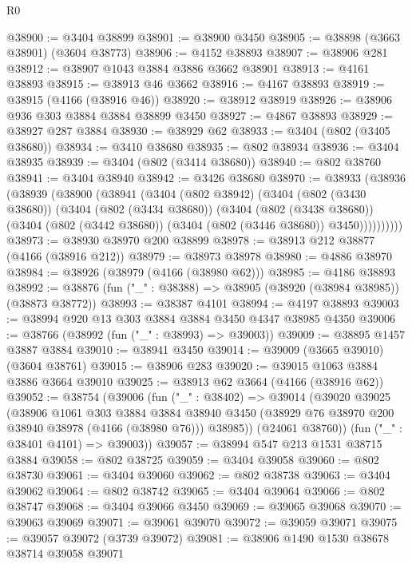 \begin{lexlean}{R0}
\begin{coremodule}
@38900 := @3404 @38899
@38901 := @38900 @3450
@38905 := @38898 (@3663 @38901) (@3604 @38773)
@38906 := @4152 @38893
@38907 := @38906 @281
@38912 := @38907 @1043 @3884 @3886 @3662 @38901
@38913 := @4161 @38893
@38915 := @38913 @46 @3662
@38916 := @4167 @38893
@38919 := @38915 (@4166 (@38916 @46))
@38920 := @38912 @38919
@38926 := @38906 @936 @303 @3884 @3884 @38899 @3450
@38927 := @4867 @38893
@38929 := @38927 @287 @3884
@38930 := @38929 @62
@38933 := @3404 (@802 (@3405 @38680))
@38934 := @3410 @38680
@38935 := @802 @38934
@38936 := @3404 @38935
@38939 := @3404 (@802 (@3414 @38680))
@38940 := @802 @38760
@38941 := @3404 @38940
@38942 := @3426 @38680
@38970 := @38933
    (@38936
      (@38939
        (@38900
          (@38941
            (@3404
              (@802 @38942)
              (@3404
                (@802 (@3430 @38680))
                (@3404
                  (@802 (@3434 @38680))
                  (@3404
                    (@802 (@3438 @38680))
                    (@3404 (@802 (@3442 @38680)) (@3404 (@802 (@3446 @38680)) @3450))))))))))
@38973 := @38930 @38970 @200 @38899
@38978 := @38913 @212 @38877 (@4166 (@38916 @212))
@38979 := @38973 @38978
@38980 := @4886 @38970
@38984 := @38926 (@38979 (@4166 (@38980 @62)))
@38985 := @4186 @38893
@38992 := @38876 (fun ("_" : @38388) => @38905 (@38920 (@38984 @38985)) (@38873 @38772))
@38993 := @38387 @4101
@38994 := @4197 @38893
@39003 := @38994 @920 @13 @303 @3884 @3884 @3450 @4347 @38985 @4350
@39006 := @38766 (@38992 (fun ("_" : @38993) => @39003))
@39009 := @38895 @1457 @3887 @3884
@39010 := @38941 @3450
@39014 := @39009 (@3665 @39010) (@3604 @38761)
@39015 := @38906 @283
@39020 := @39015 @1063 @3884 @3886 @3664 @39010
@39025 := @38913 @62 @3664 (@4166 (@38916 @62))
@39052 := @38754
    (@39006
      (fun ("_" : @38402) =>
      @39014
        (@39020
          @39025
          (@38906
            @1061
            @303
            @3884
            @3884
            @38940
            @3450
            (@38929 @76 @38970 @200 @38940 @38978 (@4166 (@38980 @76)))
            @38985))
        (@24061 @38760))
      (fun ("_" : @38401 @4101) => @39003))
@39057 := @38994 @547 @213 @1531 @38715 @3884
@39058 := @802 @38725
@39059 := @3404 @39058
@39060 := @802 @38730
@39061 := @3404 @39060
@39062 := @802 @38738
@39063 := @3404 @39062
@39064 := @802 @38742
@39065 := @3404 @39064
@39066 := @802 @38747
@39068 := @3404 @39066 @3450
@39069 := @39065 @39068
@39070 := @39063 @39069
@39071 := @39061 @39070
@39072 := @39059 @39071
@39075 := @39057 @39072 (@3739 @39072)
@39081 := @38906 @1490 @1530 @38678 @38714 @39058 @39071

\end{coremodule}
\end{lexlean}
